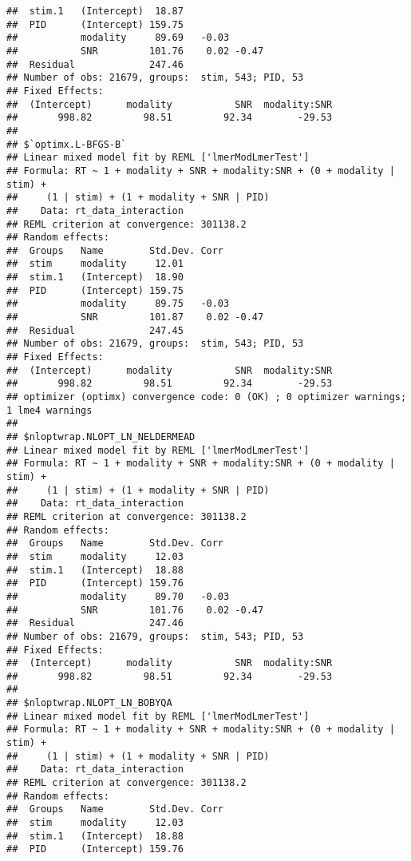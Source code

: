 \documentclass[
]{article}
\begin{document}
\begin{verbatim}
##  stim.1   (Intercept)  18.87              
##  PID      (Intercept) 159.75              
##           modality     89.69   -0.03      
##           SNR         101.76    0.02 -0.47
##  Residual             247.46              
## Number of obs: 21679, groups:  stim, 543; PID, 53
## Fixed Effects:
##  (Intercept)      modality           SNR  modality:SNR  
##       998.82         98.51         92.34        -29.53  
## 
## $`optimx.L-BFGS-B`
## Linear mixed model fit by REML ['lmerModLmerTest']
## Formula: RT ~ 1 + modality + SNR + modality:SNR + (0 + modality | stim) +  
##     (1 | stim) + (1 + modality + SNR | PID)
##    Data: rt_data_interaction
## REML criterion at convergence: 301138.2
## Random effects:
##  Groups   Name        Std.Dev. Corr       
##  stim     modality     12.01              
##  stim.1   (Intercept)  18.90              
##  PID      (Intercept) 159.75              
##           modality     89.75   -0.03      
##           SNR         101.87    0.02 -0.47
##  Residual             247.45              
## Number of obs: 21679, groups:  stim, 543; PID, 53
## Fixed Effects:
##  (Intercept)      modality           SNR  modality:SNR  
##       998.82         98.51         92.34        -29.53  
## optimizer (optimx) convergence code: 0 (OK) ; 0 optimizer warnings; 1 lme4 warnings 
## 
## $nloptwrap.NLOPT_LN_NELDERMEAD
## Linear mixed model fit by REML ['lmerModLmerTest']
## Formula: RT ~ 1 + modality + SNR + modality:SNR + (0 + modality | stim) +  
##     (1 | stim) + (1 + modality + SNR | PID)
##    Data: rt_data_interaction
## REML criterion at convergence: 301138.2
## Random effects:
##  Groups   Name        Std.Dev. Corr       
##  stim     modality     12.03              
##  stim.1   (Intercept)  18.88              
##  PID      (Intercept) 159.76              
##           modality     89.70   -0.03      
##           SNR         101.76    0.02 -0.47
##  Residual             247.46              
## Number of obs: 21679, groups:  stim, 543; PID, 53
## Fixed Effects:
##  (Intercept)      modality           SNR  modality:SNR  
##       998.82         98.51         92.34        -29.53  
## 
## $nloptwrap.NLOPT_LN_BOBYQA
## Linear mixed model fit by REML ['lmerModLmerTest']
## Formula: RT ~ 1 + modality + SNR + modality:SNR + (0 + modality | stim) +  
##     (1 | stim) + (1 + modality + SNR | PID)
##    Data: rt_data_interaction
## REML criterion at convergence: 301138.2
## Random effects:
##  Groups   Name        Std.Dev. Corr       
##  stim     modality     12.03              
##  stim.1   (Intercept)  18.88              
##  PID      (Intercept) 159.76              

\end{verbatim}
\end{document}
